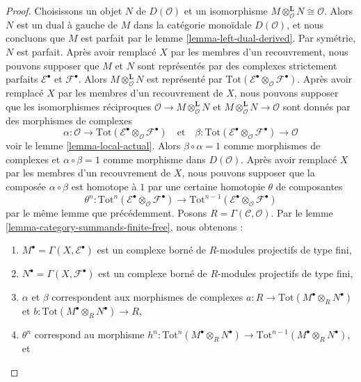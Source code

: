 \begin{proof}
\medskip\noindent
Choisissons un objet $N$ de $D(\mathcal{O})$ et un isomorphisme
$M \otimes_\mathcal{O}^\mathbf{L} N \cong \mathcal{O}$. Alors $N$ est un dual
à gauche de $M$ dans la catégorie monoïdale $D(\mathcal{O})$, et nous
concluons que $M$ est parfait par le lemme \ref{lemma-left-dual-derived}. Par
symétrie, $N$ est parfait. Après avoir remplacé $X$ par les membres d'un
recouvrement, nous pouvons supposer que $M$ et $N$ sont représentés par des
complexes strictement parfaits $\mathcal{E}^\bullet$ et
$\mathcal{F}^\bullet$. Alors $M \otimes_\mathcal{O}^\mathbf{L} N$ est
représenté par
$\text{Tot}(\mathcal{E}^\bullet \otimes_\mathcal{O} \mathcal{F}^\bullet)$.
Après avoir remplacé $X$ par les membres d'un recouvrement de $X$, nous
pouvons supposer que les isomorphismes réciproques
$\mathcal{O} \to M \otimes_\mathcal{O}^\mathbf{L} N$ et
$M \otimes_\mathcal{O}^\mathbf{L} N \to \mathcal{O}$ sont donnés par des
morphismes de complexes
$$
\alpha : \mathcal{O} \to
\text{Tot}(\mathcal{E}^\bullet \otimes_\mathcal{O} \mathcal{F}^\bullet)
\quad\text{et}\quad
\beta :
\text{Tot}(\mathcal{E}^\bullet \otimes_\mathcal{O} \mathcal{F}^\bullet)
\to \mathcal{O}
$$
voir le lemme \ref{lemma-local-actual}. Alors $\beta \circ \alpha = 1$ comme
morphismes de complexes et $\alpha \circ \beta = 1$ comme morphisme dans
$D(\mathcal{O})$. Après avoir remplacé $X$ par les membres d'un recouvrement
de $X$, nous pouvons supposer que la composée $\alpha \circ \beta$ est
homotope à $1$ par une certaine homotopie $\theta$ de composantes
$$
\theta^n :
\text{Tot}^n(\mathcal{E}^\bullet \otimes_\mathcal{O} \mathcal{F}^\bullet)
\to
\text{Tot}^{n - 1}(
\mathcal{E}^\bullet \otimes_\mathcal{O} \mathcal{F}^\bullet)
$$
par le même lemme que précédemment. Posons
$R = \Gamma(\mathcal{C}, \mathcal{O})$. Par le lemme
\ref{lemma-category-summands-finite-free}, nous obtenons :
\begin{enumerate}
\item $M^\bullet = \Gamma(X, \mathcal{E}^\bullet)$
est un complexe borné de $R$-modules projectifs de type fini,
\item $N^\bullet = \Gamma(X, \mathcal{F}^\bullet)$
est un complexe borné de $R$-modules projectifs de type fini,
\item $\alpha$ et $\beta$ correspondent aux morphismes de complexes
$a : R \to \text{Tot}(M^\bullet \otimes_R N^\bullet)$ et
$b : \text{Tot}(M^\bullet \otimes_R N^\bullet) \to R$,
\item $\theta^n$ correspond au morphisme
$h^n : \text{Tot}^n(M^\bullet \otimes_R N^\bullet) \to
\text{Tot}^{n - 1}(M^\bullet \otimes_R N^\bullet)$, et

\end{enumerate}
\end{proof}
